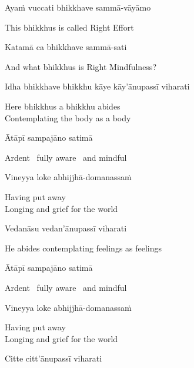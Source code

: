 Ayaṁ vuccati bhikkhave sammā-vāyāmo

\begin{english}
  This bhikkhus is called Right Effort
\end{english}

Katamā ca bhikkhave sammā-sati

\begin{english}
  And what bhikkhus is Right Mindfulness?
\end{english}

Idha bhikkhave bhikkhu kāye kāy'ānupassī viharati

\begin{english}
  Here bhikkhus a bhikkhu abides\\
  Contemplating the body as a body
\end{english}

Ātāpī sampajāno satimā

\begin{english}
  Ardent \breathmark\ fully aware \breathmark\ and mindful
\end{english}

Vineyya loke abhijjhā-domanassaṁ

\begin{english}
  Having put away\\
  Longing and grief for the world\ifdigitalversion\makeatletter\hyperlink{endnote62-appendix}\makeatother\fi
\end{english}

Vedanāsu vedan'ānupassī viharati

\begin{english}
  He abides contemplating feelings as feelings
\end{english}

Ātāpī sampajāno satimā

\begin{english}
  Ardent \breathmark\ fully aware \breathmark\ and mindful
\end{english}

Vineyya loke abhijjhā-domanassaṁ

\begin{english}
  Having put away\\
  Longing and grief for the world
\end{english}

Citte citt'ānupassī viharati

